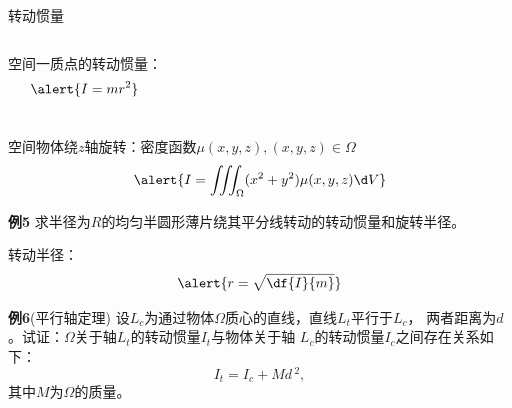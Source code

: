 \begin{frame}{转动惯量}
	\linespread{1.2}\pause 
	\begin{columns}
		{\bb 空间一质点的转动惯量：}
			$$\alert{I=mr^2}$$
			\begin{center}
				\pause {}
			\end{center}
	\end{columns}
	{\bb \pause 空间物体绕$z$轴旋转：}\pause 密度函数$\mu(x,y,z),(x,y,z)\in\Omega$\pause
	$$\alert{I=\iiint_{\Omega}(x^2+y^2)\mu(x,y,z)\d V}$$
\end{frame}

\begin{frame}
	\linespread{1.2}
	\begin{exampleblock}{{\bf 例5}\hfill}
		求半径为$R$的均匀半圆形薄片绕其平分线转动的转动惯量和旋转半径。
	\end{exampleblock}
	\bigskip\pause 
	{\bb 转动半径：}
	$$\alert{r=\sqrt{\df{I}{m}}}$$
\end{frame}

\begin{frame}
	\linespread{1.2}
	\begin{exampleblock}{{\bf 例6}(平行轴定理)\hfill}
		设$L_c$为通过物体$\Omega$质心的直线，直线$L_t$平行于$L_c$，
		两者距离为$d$。试证：$\Omega$关于轴$L_t$的转动惯量$I_t$与物体关于轴
		$L_c$的转动惯量$I_c$之间存在关系如下：
		$$I_t=I_c+Md\,^2,$$
		其中$M$为$\Omega$的质量。
	\end{exampleblock}
\end{frame}

